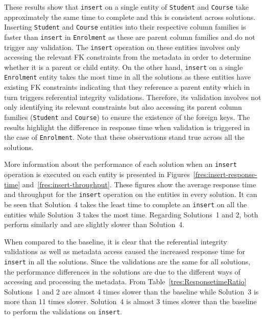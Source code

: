 These results show
that \texttt{insert} on a single entity of \texttt{Student} and \texttt{Course}
take approximately the same time to complete and this is consistent across
solutions.  Inserting \texttt{Student} and \texttt{Course} entities into their
respective column families is faster than \texttt{insert} in \texttt{Enrolment}
as these are parent column families and do not trigger any validation. 
The \texttt{insert} operation on these entities involves only accessing the
relevant \ac{FK} constraints from the metadata in order to determine whether it
is a parent or child entity.  
On the other hand,  \texttt{insert} on a single \texttt{Enrolment} entity takes
the most time in all the solutions as these entities have existing \ac{FK}
constraints indicating that they reference a parent entity which in turn triggers
referential integrity validations.  Therefore,   its validation involves not only
identifying its relevant constraints but also accessing its parent column
families (\texttt{Student} and \texttt{Course}) to ensure the existence of the
foreign keys. 
The results highlight the difference in response time when validation is
triggered in the case of \texttt{Enrolment}. 
Note that these observations stand true across all the solutions. 

More information about the performance of each solution when an \texttt{insert}
operation is executed on each entity is presented in
Figures~\ref{fres:insert-response-time}
and~\ref{fres:insert-throughput}. 
These figures show the average response time and throughput for the
\texttt{insert} operation on  the  entities in every solution. 
It can be seen that Solution~4 takes the least time to
complete an \texttt{insert} on all the entities while Solution~3 takes the most
time.  Regarding Solutions~1 and 2,  both perform similarly and are slightly
slower than Solution~4.  

When compared to the baseline,  it is clear that the referential integrity
validations as well as metadata access caused the increased response time for
\texttt{insert} in all the solutions.  Since the validations are the same for all
solutions,  the performance differences in the solutions are due to the different
ways of accessing and processing the metadata.  From Table~\ref{tres:ResponsetimeRatio}
Solutions~1 and 2  are almost 4 times slower than the
baseline while Solution~3 is more than 11 times
slower.  Solution~4 is almost 3 times slower than the baseline to perform the
validations on \texttt{insert}.  

